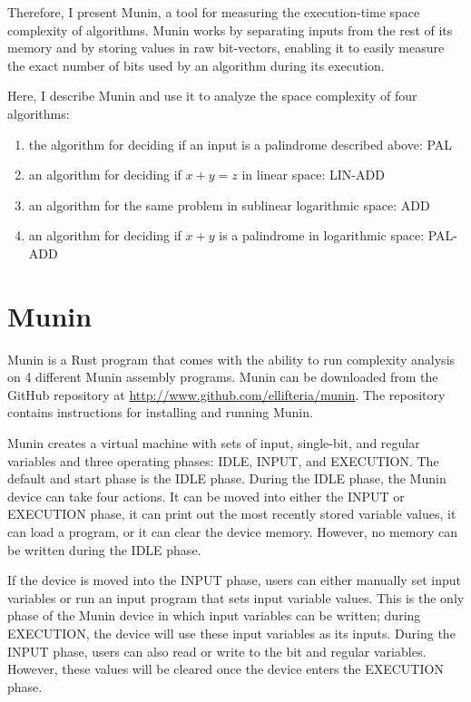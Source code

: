 \documentclass[11pt, a4paper]{article}
\begin{document}
Therefore, I present Munin, a tool for measuring the execution-time space complexity of algorithms.
Munin works by separating inputs from the rest of its memory and by storing values in raw bit-vectors, enabling it to easily measure the exact number of bits used by an algorithm during its execution.

Here, I describe Munin and use it to analyze the space complexity of four algorithms:
\begin{enumerate}
    \item the algorithm for deciding if an input is a palindrome described above: PAL
    \item an algorithm for deciding if \(x+y=z\) in linear space: LIN-ADD
    \item an algorithm for the same problem in sublinear logarithmic space: ADD
    \item an algorithm for deciding if \(x+y\) is a palindrome in logarithmic space: PAL-ADD
\end{enumerate}

\section{Munin}

Munin is a Rust program that comes with the ability to run complexity analysis on 4 different Munin assembly programs.
Munin can be downloaded from the GitHub repository at \url{http://www.github.com/ellifteria/munin}.
The repository contains instructions for installing and running Munin.

Munin creates a virtual machine with sets of input, single-bit, and regular variables and three operating phases: IDLE, INPUT, and EXECUTION.
The default and start phase is the IDLE phase.
During the IDLE phase, the Munin device can take four actions.
It can be moved into either the INPUT or EXECUTION phase, it can print out the most recently stored variable values, it can load a program, or it can clear the device memory.
However, no memory can be written during the IDLE phase.

If the device is moved into the INPUT phase, users can either manually set input variables or run an input program that sets input variable values.
This is the only phase of the Munin device in which input variables can be written; during EXECUTION, the device will use these input variables as its inputs.
During the INPUT phase, users can also read or write to the bit and regular variables.
However, these values will be cleared once the device enters the EXECUTION phase.
\end{document}
